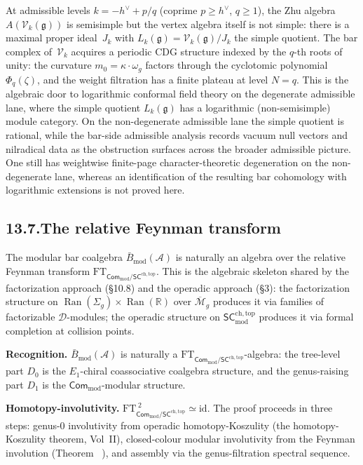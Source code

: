 \documentclass[11pt]{report}
\makeatletter
\theoremstyle{definition}
\theoremstyle{remark}
\providecommand{\cA}{\mathcal{A}}
\providecommand{\cM}{\mathcal{M}}
\providecommand{\barB}{\bar{B}}
\numberwithin{equation}{section}
\let\svy@oldref\ref
\renewcommand{\ref}[1]{%
 \@ifundefined{r@#1}{\textit{full monograph}}{\svy@oldref{#1}}%
}
\makeatother
\begin{document}
At admissible levels $k = -h^\vee + p/q$ (coprime $p \ge h^\vee$,
$q \ge 1$), the Zhu algebra $A(\mathcal{V}_k(\mathfrak g))$ is
semisimple but the vertex algebra itself is not simple: there is a
maximal proper ideal~$J_k$ with $L_k(\mathfrak g) =
\mathcal{V}_k(\mathfrak g)/J_k$ the simple quotient. The bar
complex of~$\mathcal{V}_k$ acquires a periodic CDG structure indexed
by the $q$-th roots of unity: the curvature $m_0 = \kappa \cdot
\omega_g$ factors through the cyclotomic polynomial
$\Phi_q(\zeta)$, and the weight filtration has a finite plateau at
level $N = q$. This is the algebraic door to logarithmic conformal
field theory on the degenerate admissible lane, where the simple
quotient $L_k(\mathfrak g)$ has a logarithmic
\textup{(}non-semisimple\textup{)} module category. On the
non-degenerate admissible lane the simple quotient is rational,
while the bar-side admissible analysis records vacuum null vectors
and nilradical data as the obstruction surfaces across the broader
admissible picture. One still has weightwise finite-page
character-theoretic degeneration on the non-degenerate lane,
whereas an identification of the resulting bar
cohomology with logarithmic extensions is not proved here.

\subsection*{13.7.\enspace The relative Feynman transform}

The modular bar coalgebra $\barB_{\mathrm{mod}}(\cA)$ is naturally
an algebra over the relative Feynman transform
$\mathrm{FT}_{\mathsf{Com}_{\mathrm{mod}} /
\mathsf{SC}^{\mathrm{ch,top}}}$.
This is the algebraic skeleton shared by the factorization approach
(\S10.8) and the operadic approach (\S3): the factorization structure
on $\operatorname{Ran}(\Sigma_g) \times \operatorname{Ran}(\mathbb R)$
over $\overline{\cM}_g$ produces it via families of factorizable
$\mathcal D$-modules; the operadic structure on
$\mathsf{SC}^{\mathrm{ch,top}}_{\mathrm{mod}}$ produces it via
formal completion at collision points.

\medskip
\noindent\textbf{Recognition.}\enspace
$\barB_{\mathrm{mod}}(\cA)$ is naturally a
$\mathrm{FT}_{\mathsf{Com}_{\mathrm{mod}} /
\mathsf{SC}^{\mathrm{ch,top}}}$-algebra:
the tree-level part $D_0$ is the
$E_1$-chiral coassociative coalgebra structure, and the
genus-raising part $D_1$ is the
$\mathsf{Com}_{\mathrm{mod}}$-modular structure.

\medskip
\noindent\textbf{Homotopy-involutivity.}\enspace
$\mathrm{FT}_{\mathsf{Com}_{\mathrm{mod}} /
\mathsf{SC}^{\mathrm{ch,top}}}^{\;2} \simeq \mathrm{id}$.
The proof proceeds in three steps:
genus-$0$ involutivity from operadic homotopy-Koszulity
(the homotopy-Koszulity theorem, Vol~II),
closed-colour modular involutivity from the Feynman involution
(Theorem~\ref{thm:feynman-involution}),
and assembly via the genus-filtration spectral sequence.
\end{document}
